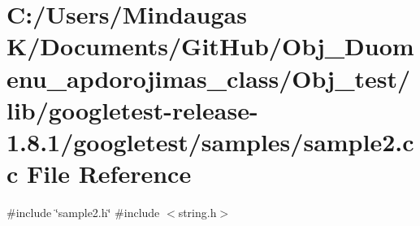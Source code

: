 \hypertarget{_obj__test_2lib_2googletest-release-1_88_81_2googletest_2samples_2sample2_8cc}{}\section{C\+:/\+Users/\+Mindaugas K/\+Documents/\+Git\+Hub/\+Obj\+\_\+\+Duomenu\+\_\+apdorojimas\+\_\+class/\+Obj\+\_\+test/lib/googletest-\/release-\/1.8.1/googletest/samples/sample2.cc File Reference}
\label{_obj__test_2lib_2googletest-release-1_88_81_2googletest_2samples_2sample2_8cc}
{\ttfamily \#include \char`\"{}sample2.\+h\char`\"{}}\newline
{\ttfamily \#include $<$string.\+h$>$}\newline
